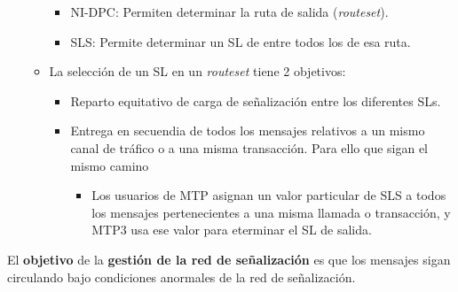 \documentclass[10pt,portrait, twocolumn]{article}
\begin{document}
\begin{itemize}
\begin{itemize}
			\begin{itemize}
			\item NI-DPC: Permiten determinar la ruta de salida (\textit{routeset}).
			\item SLS: Permite determinar un SL de entre todos los de esa ruta.
			\end{itemize}
		\item La selección de un SL en un \textit{routeset} tiene 2 objetivos:
			\begin{itemize}
			\item Reparto equitativo de carga de señalización entre los diferentes SLs.
			\item Entrega en secuendia de todos los mensajes relativos a un mismo canal de tráfico o a una misma transacción. Para ello que sigan el mismo camino
				\begin{itemize}
				\item Los usuarios de MTP asignan un valor particular de SLS a todos los mensajes pertenecientes a una misma llamada o transacción, y MTP3 usa ese valor para eterminar el SL de salida.
				\end{itemize}
			\end{itemize}
		\end{itemize}
	\end{itemize}
	
El \textbf{objetivo} de la \textbf{gestión de la red de señalización} es que los mensajes sigan circulando bajo condiciones anormales de la red de señalización.
\end{document}
